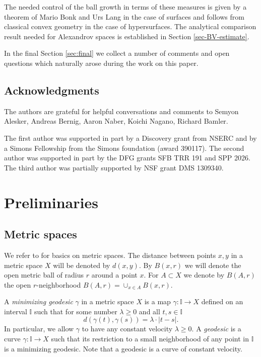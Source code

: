 \documentclass[12pt,leqno,intlimits]{amsart}
\numberwithin{equation}{section}
\theoremstyle{definition}
\theoremstyle{remark}
\def\:{\colon}
\begin{document}
The needed control of the ball growth in terms of these measures is given by a theorem of Mario  Bonk and Urs Lang in the case of surfaces and follows from classical convex geometry in the case of hypersurfaces.
The analytical comparison result needed for Alexandrov spaces is established in Section \ref{sec-BV-estimate}.

In the final Section \ref{sec:final} we collect a number of comments and open questions which naturally arose during the work on this paper.

\subsection{Acknowledgments} The authors are grateful for helpful conversations and comments to Semyon Alesker, Andreas Bernig, Aaron Naber, Koichi Nagano, Richard Bamler.

The first author was supported in part by a Discovery grant from NSERC and by a Simons Fellowship from the Simons foundation (award 390117).
The second author was supported in part by the DFG grants SFB TRR 191 and SPP 2026.
The third author was partially supported by NSF grant DMS 1309340.

\section{Preliminaries} \label{sec:prelim}
\subsection{Metric spaces}
We refer to \cite{BBI01} for basics on metric spaces.
The distance between points $x,y$ in a metric space $X$ will be denoted by $d(x,y)$.
By $B(x,r)$ we will denote the open metric ball of radius $r$ around a point $x$. For $A\subset X$
we denote by $B (A,r)$ the open $r$-neighborhood $B (A,r) =\cup _{x\in A} B (x,r)$.

A \emph {minimizing geodesic} $\gamma$ in a metric space $X$ is a map $\gamma \: \mathbb I\to X$ defined on an interval $\mathbb I$ such that for some number $\lambda \geq 0$ and all $t,s\in \mathbb I$
$$ d(\gamma (t),\gamma (s)) =\lambda \cdot |t-s|.$$
In particular, we allow $\gamma$ to have any constant velocity $\lambda \geq 0$.
A \emph{geodesic} is a curve $\gamma\: \mathbb I\to X$ such that its restriction to a small neighborhood of any point in $\mathbb I$ is a minimizing geodesic.
Note that a geodesic is a curve of constant velocity.
\end{document}

